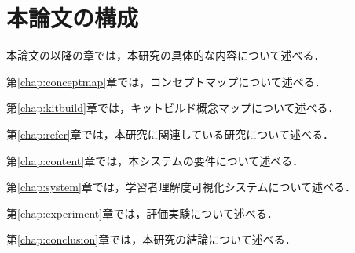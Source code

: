 \section{本論文の構成}
本論文の以降の章では，本研究の具体的な内容について述べる．

第\ref{chap:conceptmap}章では，コンセプトマップについて述べる．

第\ref{chap:kitbuild}章では，キットビルド概念マップについて述べる．

第\ref{chap:refer}章では，本研究に関連している研究について述べる．

第\ref{chap:content}章では，本システムの要件について述べる．

第\ref{chap:system}章では，学習者理解度可視化システムについて述べる．

第\ref{chap:experiment}章では，評価実験について述べる．

第\ref{chap:conclusion}章では，本研究の結論について述べる．